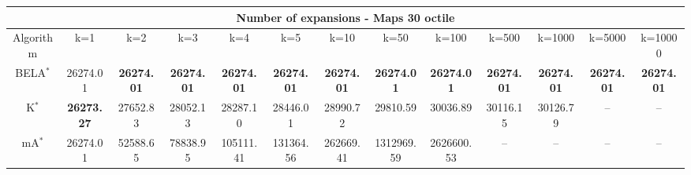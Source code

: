 \begin{tabular}{c|cccccccccccc}\toprule
\multicolumn{13}{c}{Number of expansions - Maps 30 octile}\\ \midrule
Algorithm & k=1 & k=2 & k=3 & k=4 & k=5 & k=10 & k=50 & k=100 & k=500 & k=1000 & k=5000 & k=10000 \\ \midrule
BELA$^*$ & 26274.01 & \textbf{26274.01} & \textbf{26274.01} & \textbf{26274.01} & \textbf{26274.01} & \textbf{26274.01} & \textbf{26274.01} & \textbf{26274.01} & \textbf{26274.01} & \textbf{26274.01} & \textbf{26274.01} & \textbf{26274.01} \\
K$^*$ & \textbf{26273.27} & 27652.83 & 28052.13 & 28287.10 & 28446.01 & 28990.72 & 29810.59 & 30036.89 & 30116.15 & 30126.79 & -- & -- \\
mA$^*$ & 26274.01 & 52588.65 & 78838.95 & 105111.41 & 131364.56 & 262669.41 & 1312969.59 & 2626600.53 & -- & -- & -- & -- \\ \bottomrule 
\end{tabular}
